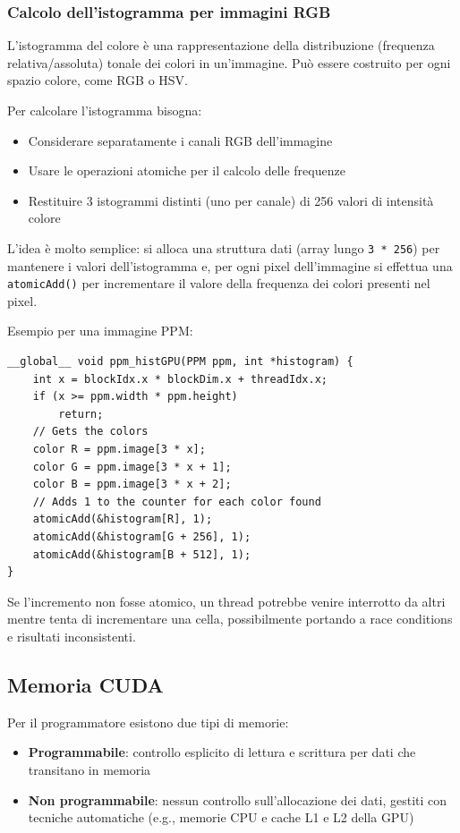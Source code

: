 \subsubsection{Calcolo dell'istogramma per immagini RGB}

L'istogramma del colore è una rappresentazione della distribuzione (frequenza relativa/assoluta) tonale dei colori in un'immagine. Può essere costruito per ogni spazio colore, come RGB o HSV.

Per calcolare l'istogramma bisogna: 
\begin{itemize}
	\item Considerare separatamente i canali RGB dell'immagine
	
	\item Usare le operazioni atomiche per il calcolo delle frequenze 
	
	\item Restituire 3 istogrammi distinti (uno per canale) di 256 valori di intensità colore
\end{itemize}

L'idea è molto semplice: si alloca una struttura dati (array lungo \texttt{3 * 256}) per mantenere i valori dell'istogramma e, per ogni pixel dell'immagine si effettua una \texttt{atomicAdd()} per incrementare il valore della frequenza dei colori presenti nel pixel. 

Esempio per una immagine PPM: 
\begin{verbatim}
__global__ void ppm_histGPU(PPM ppm, int *histogram) {
    int x = blockIdx.x * blockDim.x + threadIdx.x;
    if (x >= ppm.width * ppm.height)
        return;
    // Gets the colors
    color R = ppm.image[3 * x];
    color G = ppm.image[3 * x + 1];
    color B = ppm.image[3 * x + 2];
    // Adds 1 to the counter for each color found
    atomicAdd(&histogram[R], 1);
    atomicAdd(&histogram[G + 256], 1);
    atomicAdd(&histogram[B + 512], 1);
}
\end{verbatim}

Se l'incremento non fosse atomico, un thread potrebbe venire interrotto da altri mentre tenta di incrementare una cella, possibilmente portando a race conditions e risultati inconsistenti.

\subsection{Memoria CUDA}

Per il programmatore esistono due tipi di memorie: 
\begin{itemize}
	\item \textbf{Programmabile}: controllo esplicito di lettura e scrittura per dati che transitano in memoria
	
	\item \textbf{Non programmabile}: nessun controllo sull'allocazione dei dati, gestiti con tecniche automatiche (e.g., memorie CPU e cache L1 e L2 della GPU)
\end{itemize}

